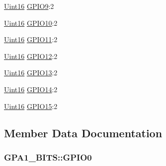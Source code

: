 \begin{DoxyCompactItemize}
\item 
\hyperlink{_d_s_p2833x___device_8h_a59a9f6be4562c327cbfb4f7e8e18f08b}{Uint16} \hyperlink{struct_g_p_a1___b_i_t_s_aff2c1b599b48835736926d2c5b1577bf}{G\+P\+I\+O9}\+:2
\item 
\hyperlink{_d_s_p2833x___device_8h_a59a9f6be4562c327cbfb4f7e8e18f08b}{Uint16} \hyperlink{struct_g_p_a1___b_i_t_s_a4856943e07d1e37a1b1f64b46841f50f}{G\+P\+I\+O10}\+:2
\item 
\hyperlink{_d_s_p2833x___device_8h_a59a9f6be4562c327cbfb4f7e8e18f08b}{Uint16} \hyperlink{struct_g_p_a1___b_i_t_s_a8e3ced9b09a8fb39df0d4f1f5236a4b7}{G\+P\+I\+O11}\+:2
\item 
\hyperlink{_d_s_p2833x___device_8h_a59a9f6be4562c327cbfb4f7e8e18f08b}{Uint16} \hyperlink{struct_g_p_a1___b_i_t_s_a256c057b15ce22be1298afe6425e3b74}{G\+P\+I\+O12}\+:2
\item 
\hyperlink{_d_s_p2833x___device_8h_a59a9f6be4562c327cbfb4f7e8e18f08b}{Uint16} \hyperlink{struct_g_p_a1___b_i_t_s_a8ecf8e6048cf0c440cb7221910b4c09d}{G\+P\+I\+O13}\+:2
\item 
\hyperlink{_d_s_p2833x___device_8h_a59a9f6be4562c327cbfb4f7e8e18f08b}{Uint16} \hyperlink{struct_g_p_a1___b_i_t_s_ab5c86d6c342b38eed7d6afb4e983451d}{G\+P\+I\+O14}\+:2
\item 
\hyperlink{_d_s_p2833x___device_8h_a59a9f6be4562c327cbfb4f7e8e18f08b}{Uint16} \hyperlink{struct_g_p_a1___b_i_t_s_ad1a268e8e60f56fd3acca43b37bd642f}{G\+P\+I\+O15}\+:2
\end{DoxyCompactItemize}


\subsection{Member Data Documentation}
\hypertarget{struct_g_p_a1___b_i_t_s_ad770aeb6125d2434bdc6a96e8164a094}{}
\subsubsection[{G\+P\+I\+O0}]{ G\+P\+A1\+\_\+\+B\+I\+T\+S\+::\+G\+P\+I\+O0}\label{struct_g_p_a1___b_i_t_s_ad770aeb6125d2434bdc6a96e8164a094}
\hypertarget{struct_g_p_a1___b_i_t_s_a72883a1bd144c6c9cd93a39d3763d0d8}{}
